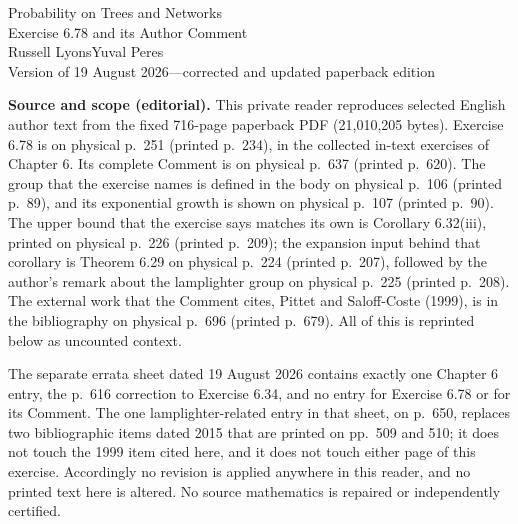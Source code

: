 \documentclass[11pt]{article}
\begin{document}
\begin{center}
{\large Probability on Trees and Networks\\[2pt]Exercise 6.78 and its Author Comment}\\[4pt]
Russell Lyons\quad Yuval Peres\\[2pt]
Version of 19 August 2026---corrected and updated paperback edition
\end{center}

\noindent\textbf{Source and scope (editorial).}
This private reader reproduces selected English author text from the fixed 716-page paperback PDF (21,010,205 bytes). Exercise 6.78 is on physical p.\ 251 (printed p.\ 234), in the collected in-text exercises of Chapter 6. Its complete Comment is on physical p.\ 637 (printed p.\ 620). The group that the exercise names is defined in the body on physical p.\ 106 (printed p.\ 89), and its exponential growth is shown on physical p.\ 107 (printed p.\ 90). The upper bound that the exercise says matches its own is Corollary 6.32(iii), printed on physical p.\ 226 (printed p.\ 209); the expansion input behind that corollary is Theorem 6.29 on physical p.\ 224 (printed p.\ 207), followed by the author's remark about the lamplighter group on physical p.\ 225 (printed p.\ 208). The external work that the Comment cites, Pittet and Saloff-Coste (1999), is in the bibliography on physical p.\ 696 (printed p.\ 679). All of this is reprinted below as uncounted context.

The separate errata sheet dated 19 August 2026 contains exactly one Chapter 6 entry, the p.\ 616 correction to Exercise 6.34, and no entry for Exercise 6.78 or for its Comment. The one lamplighter-related entry in that sheet, on p.\ 650, replaces two bibliographic items dated 2015 that are printed on pp.\ 509 and 510; it does not touch the 1999 item cited here, and it does not touch either page of this exercise. Accordingly no revision is applied anywhere in this reader, and no printed text here is altered. No source mathematics is repaired or independently certified.
\end{document}
